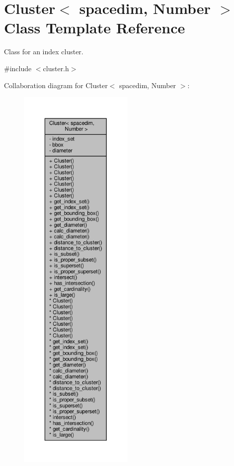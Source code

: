 \hypertarget{classCluster}{}\section{Cluster$<$ spacedim, Number $>$ Class Template Reference}
\label{classCluster}


Class for an index cluster.  




{\ttfamily \#include $<$cluster.\+h$>$}



Collaboration diagram for Cluster$<$ spacedim, Number $>$\+:\nopagebreak
\begin{figure}[H]
\begin{center}
\leavevmode
\includegraphics[height=550pt]{classCluster__coll__graph}
\end{center}
\end{figure}
